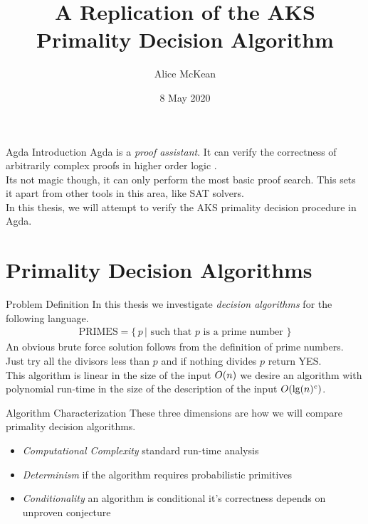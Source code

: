 \documentclass{beamer}
\title{
  A Replication of the AKS\\
  Primality Decision Algorithm
}
\date{8 May 2020}
\author{Alice McKean}
\institute{
  The Division of Mathematical and Natural Sciences \\
  Reed College
}
\DeclarePairedDelimiter\Parens{\lparen}{\rparen}
\newcommand{\Agda}[0]{Agda}
\newcommand{\BigO}[1]{\ensuremath{O\Parens{#1}}}
\newcommand{\Lg}[1]{\ensuremath{\text{lg}\Parens{#1}}}
\begin{document}
\maketitle

\begin{frame}{\Agda{} Introduction}
  \Agda{} is a \textit{proof assistant}. It can verify the correctness of
  arbitrarily complex proofs in higher order logic \cite{agda}. \\
  Its not magic though, it can only perform the most basic proof search. This
  sets it apart from other tools in this area, like SAT solvers. \\
  In this thesis, we will attempt to verify the AKS primality decision procedure
  in \Agda{}.
\end{frame}

\section{Primality Decision Algorithms}

\begin{frame}{Problem Definition}
  In this thesis we investigate \textit{decision algorithms} for the following
  language.
  \begin{align*}
    \text{PRIMES} = \{ \, p \, | \text{ such that } p \text{ is a prime number } \}
  \end{align*}
  An obvious brute force solution follows from the definition of prime numbers.
  Just try all the divisors less than $p$ and if nothing divides $p$ return YES. \\

  This algorithm is linear in the size of the input $\BigO{n}$ we desire an
  algorithm with polynomial run-time in the size of the description of
  the input $\BigO{\Lg{n}^c}$.
\end{frame}
\begin{frame}{Algorithm Characterization}
  These three dimensions are how we will compare primality decision algorithms.
  \begin{itemize}
    \item \textit{Computational Complexity} standard run-time analysis
    \item \textit{Determinism} if the algorithm requires probabilistic primitives
    \item \textit{Conditionality} an algorithm is conditional it's correctness
      depends on unproven conjecture
  \end{itemize}
\end{frame}
\end{document}
